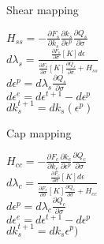\documentclass[12pt]{article}
\begin{document}
\begin{algorithm}[H]
\renewcommand{\thealgocf}{Subroutine1}
\caption{Shear mapping}
$H_{ss} = - \frac{\partial F_s}{\partial k_s} \frac{\partial k_s}{\partial \epsilon^p} \frac{\partial Q_s}{\partial \sigma}$\\
$d\lambda_s = \frac{\frac{\partial F_s}{\partial \sigma}[K]d\epsilon}{\frac{\partial F_s}{\partial \sigma}[K]\frac{\partial Q_s}{\partial \sigma}+H_{ss}}$\\
$d\epsilon^p=d\lambda_s \frac{\partial Q_s}{\partial \sigma}$\\
$d\epsilon^e=d\epsilon^{t+1}-d\epsilon^p$\\
$dk_s^{t+1}=dk_s(\epsilon^p)$\\
\end{algorithm}

\begin{algorithm}[H]
\renewcommand{\thealgocf}{Subroutine2}
\caption{Cap mapping}
$H_{cc} = - \frac{\partial F_c}{\partial k_c} \frac{\partial k_c}{\partial \epsilon^p} \frac{\partial Q_c}{\partial \sigma}$\\
$d\lambda_c = \frac{\frac{\partial F_c}{\partial \sigma}[K]d\epsilon}{\frac{\partial F_c}{\partial \sigma}[K]\frac{\partial Q_c}{\partial \sigma}+H_{cc}}$\\
$d\epsilon^p=d\lambda_c \frac{\partial Q_c}{\partial \sigma}$\\
$d\epsilon^e=d\epsilon^{t+1}-d\epsilon^p$\\
$dk_s^{t+1}=dk_s\epsilon^p)$\\
\end{algorithm}
\end{document}
